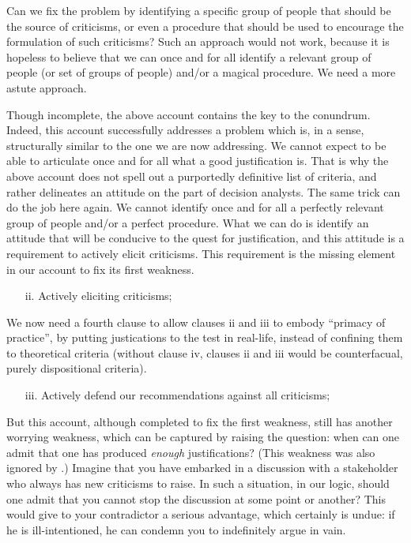 \documentclass[preprint, french, english, 11pt, authoryear]{elsarticle}%
\begin{document}
Can we fix the problem by identifying a specific group of people that should be the source of criticisms, or even a procedure that should be used to encourage the formulation of such criticisms? Such an approach would not work, because it is hopeless to believe that we can once and for all identify a relevant group of people (or set of groups of people) and/or a magical procedure. We need a more astute approach.

Though incomplete, the above account contains the key to the conundrum. Indeed, this account successfully addresses a problem which is, in a sense, structurally similar to the one we are now addressing. We cannot expect to be able to articulate once and for all what a good justification is. That is why the above account does not spell out a purportedly definitive list of criteria, and rather delineates an attitude on the part of decision analysts. The same trick can do the job here again. We cannot identify once and for all a perfectly relevant group of people and/or a perfect procedure. What we can do is identify an attitude that will be conducive to the quest for justification, and this attitude is a requirement to actively elicit criticisms. This requirement is the missing element in our account to fix its first weakness.

\begin{itemize}
\item[ii.]	Actively eliciting criticisms;
\end{itemize}

We now need a fourth clause to allow clauses ii and iii to embody ``primacy of practice'', by putting justications to the test in real-life, instead of confining them to theoretical criteria (without clause iv, clauses ii and iii would be counterfacual, purely dispositional criteria).

\begin{itemize}
\item[iii.]	 Actively defend our recommendations against all criticisms;
\end{itemize}

But this account, although completed to fix the first weakness, still has another worrying weakness, which can be captured by raising the question: when can one admit that one has produced \emph{enough} justifications? (This weakness was also ignored by  \citet{meinard_what_2017}.) Imagine that you have embarked in a discussion with a stakeholder who always has new criticisms to raise. In such a situation, in our logic, should one admit that you cannot stop the discussion at some point or another? This would give to your contradictor a serious advantage, which certainly is undue: if he is ill-intentioned, he can condemn you to indefinitely argue in vain.
\end{document}
